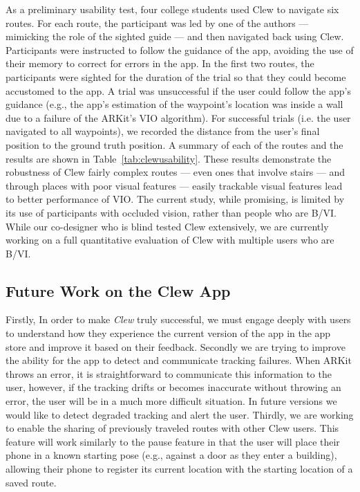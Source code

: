 \documentclass[chi_draft]{sigchi}
\newcommand{\BVI}{B/VI\xspace}
\begin{document}
As a preliminary usability test, four college students used Clew to navigate six routes.  For each route, the participant was led by one of the authors --- mimicking the role of the sighted guide --- and then navigated back using Clew.  Participants were instructed to follow the guidance of the app, avoiding the use of their memory to correct for errors in the app.  In the first two routes, the participants were sighted for the duration of the trial so that they could become accustomed to the app.  A trial was unsuccessful if the user could follow the app's guidance (e.g., the app's estimation of the waypoint's location was inside a wall due to a failure of the ARKit's VIO algorithm). For successful trials (i.e. the user navigated to all waypoints), we recorded the distance from the user's final position to the ground truth position.  A summary of each of the routes and the results are shown in Table~\ref{tab:clewusability}.  These results demonstrate the robustness of Clew fairly complex routes --- even ones that involve stairs --- and through places with poor visual features --- easily trackable visual features lead to better performance of VIO.  The current study, while promising, is limited by its use of participants with occluded vision, rather than people who are \BVI.  While our co-designer who is blind tested Clew extensively, we are currently working on a full quantitative evaluation of Clew with multiple users who are \BVI.

\subsection{Future Work on the Clew App}
Firstly, In order to make \emph{Clew} truly successful, we must engage deeply with users to understand how they experience the current version of the app in the app store and improve it based on their feedback.  Secondly we are trying to improve the ability for the app to detect and communicate tracking failures.  When ARKit throws an error, it is straightforward to communicate this information to the user, however, if the tracking drifts or becomes inaccurate without throwing an error, the user will be in a much more difficult situation.  In future versions we would like to detect degraded tracking and alert the user.  Thirdly, we are working to enable the sharing of previously traveled routes with other Clew users.  This feature will work similarly to the pause feature in that the user will place their phone in a known starting pose (e.g., against a door as they enter a building), allowing their phone to register its current location with the starting location of a saved route.
\end{document}
